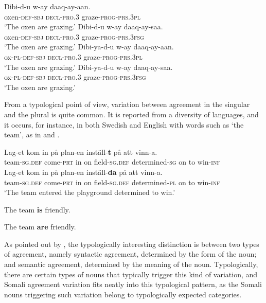\documentclass[output=paper]{langsci/langscibook}
\begin{document}
\ea
\ea
\gll Dibi-d-u     w-ay     daaq-ay-aan.\\
       oxen-\textsc{def-sbj}   \textsc{decl-pro.3}  graze-\textsc{prog-prs.3pl}\\
\glt ‘The oxen are grazing.’
\ex
\gll Dibi-d-u    w-ay    daaq-ay-saa.\\
       oxen\textsc{-def-sbj}   \textsc{decl-pro.3}  graze-\textsc{prog-prs.3fsg}\\
\glt ‘The oxen are grazing.’
\ex
\gll Dibi-ya-d-u    w-ay    daaq-ay-aan.\\
       ox\textsc{-pl-def-sbj}   \textsc{decl-pro.3}  graze-\textsc{prog-prs.3pl}\\
\glt ‘The oxen are grazing.’
\ex
\gll *Dibi-ya-d-u    w-ay    daaq-ay-saa.\\
       ox\textsc{-pl-def-sbj}    \textsc{decl-pro.3}  graze\textsc{-prog-prs.3fsg}\\
\glt ‘The oxen are grazing.’
\z
\z

From a typological point of view, variation between agreement in the singular and the plural is quite common. It is reported from a diversity of languages, and it occurs, for instance, in both Swedish and English with words such as ‘the team’, as in  and .

\ea
\ea
\gll Lag-et           kom          in på plan-en        inställ-\textbf{t}            på att vinn-a.\\
       team-\textsc{sg.def} come-\textsc{prt} in on field-\textsc{sg.def} determined-\textsc{sg} on to  win-\textsc{inf}\\

\ex
\gll Lag-et           kom          in på plan-en        inställ-\textbf{da}        på att vinn-a.\\
       team-\textsc{sg.def}  come-\textsc{prt} in on field-\textsc{sg.def} determined-\textsc{pl} on to  win-\textsc{inf} \\
\glt ‘The team entered the playground determined to win.’
\z
\z

\ea The team \textbf{is} friendly.
\z

\ea
 The team \textbf{are} friendly.
\z

As pointed out by \citet[187]{Corbett2000}, the typologically interesting distinction is between two types of agreement, namely syntactic agreement, determined by the form of the noun; and semantic agreement, determined by the meaning of the noun. Typologically, there are certain types of nouns that typically trigger this kind of variation, and Somali agreement variation fits neatly into this typological pattern, as the Somali nouns triggering such variation belong to typologically expected categories.
\end{document}
